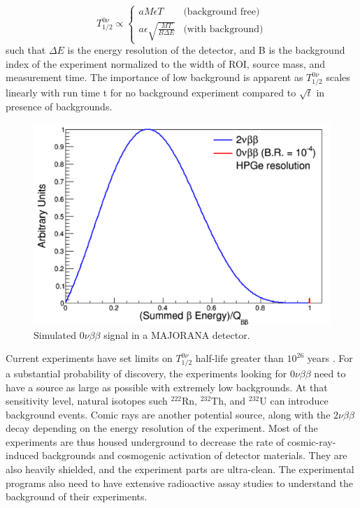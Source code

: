 \begin{equation}\label{det_sensitivity}
T^{0\nu}_{1/2} \propto
    \begin{cases}
    aM\epsilon T & \text{(background free)}\\
    a\epsilon\sqrt{\frac{MT}{B\Delta E}} & \text{(with background)}
    \end{cases}       
\end{equation}
such that $\Delta E$ is the energy resolution of the detector, and B is the background index of the experiment normalized to the width of ROI, source mass, and measurement time. The importance of low background is apparent as $T^{0\nu}_{1/2}$ scales linearly with run time t for no background experiment compared to $\sqrt{t}$ in presence of backgrounds.


\begin{figure}
\centering
\includegraphics[width=0.8\linewidth]{ch1/figs/DoubleBetaEnergy.png}
\caption{Simulated $0\nu\beta\beta$ signal in a MAJORANA detector. \cite{mjd_background}}
\label{mjd_background_fig}
\end{figure}

Current experiments have set limits on $T^{0\nu}_{1/2}$ half-life greater than $10^{26}$ years \cite{KamLANDZen2018}.  For a substantial probability of discovery, the experiments looking for $0\nu\beta\beta$ need to have a source as large as possible with extremely low backgrounds. At that sensitivity level, natural isotopes such $^{222}$Rn, $^{232}$Th, and $^{232}$U can introduce background events. Comic rays are another potential source, along with the $2\nu\beta\beta$ decay depending on the energy resolution of the experiment. Most of the experiments are thus housed underground to decrease the rate of cosmic-ray-induced backgrounds and cosmogenic activation of detector materials. They are also heavily shielded, and the experiment parts are ultra-clean. The experimental programs also need to have extensive radioactive assay studies to understand the background of their experiments.

